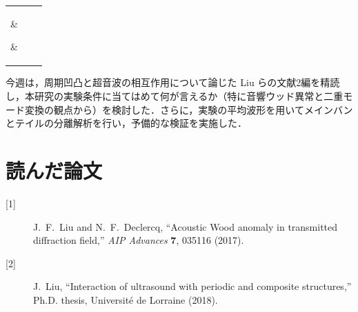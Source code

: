 \documentclass{jarticle}
\begin{document}
%
\begin{center}
 \begin{tabular}{|c|c|c|} \hline
  \parbox{50mm}{\vspace{1mm} } &
  \parbox{55mm}{\vspace{1mm} } &
  \parbox{50mm}{\vspace{1mm} }
  \\ [2mm] \hline
%
  \\ [2mm] \hline\hline
%
  \\ [2mm] \hline
 \end{tabular}
\end{center}

\par
今週は，周期凹凸と超音波の相互作用について論じた Liu らの文献2編を精読し，本研究の実験条件に当てはめて何が言えるか（特に音響ウッド異常と二重モード変換の観点から）を検討した．さらに，実験の平均波形を用いてメインバンとテイルの分離解析を行い，予備的な検証を実施した．


\section{読んだ論文}
\begin{description}
 \item[{[1]}] J.~F.~Liu and N.~F.~Declercq,
   ``Acoustic Wood anomaly in transmitted diffraction field,''
   {\it AIP Advances} {\bf 7}, 035116 (2017).
 \item[{[2]}] J.~Liu,
   ``Interaction of ultrasound with periodic and composite structures,''
   Ph.D. thesis, Universit\'e de Lorraine (2018).
\end{description}
\end{document}
